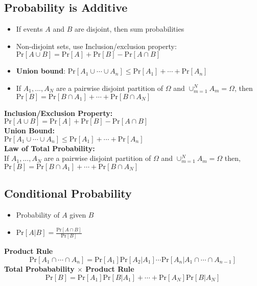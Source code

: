 \documentclass{article}\usepackage{amsmath,amssymb,amsthm,tikz,tkz-graph,color,chngpage,soul,hyperref,csquotes,graphicx,floatrow, listings}\newcommand*{\QEDB}{\hfill\ensuremath{\square}}\newtheorem*{prop}{Proposition}\renewcommand{\theenumi}{\alph{enumi}}\usepackage[shortlabels]{enumitem}\usepackage[nobreak=true]{mdframed}\usetikzlibrary{matrix,calc}\MakeOuterQuote{"}\usepackage[margin=0.75in]{geometry} \newtheorem{theorem}{Theorem}\newcommand{\Z}{\mathbb Z}\newcommand{\R}{\mathbb R}\newcommand{\Q}{\mathbb Q}\newcommand{\N}{\mathbb N}\newcommand{\x}[1]{\textrm{ #1 }}\newcommand{\pr}{\textrm{Pr}}
\begin{document}
\subsection*{Probability is Additive}
\begin{itemize}
    \item If events $A$ and $B$ are disjoint, then sum probabilities
    \item Non-disjoint sets, use Inclusion/exclusion property: $\pr[A\cup B] = \pr[A]+\pr[B]-\pr[A\cap B]$
    \item \textbf{Union bound}: $\pr[A_1\cup \cdots \cup A_n] \le \pr[A_1]+\cdots+\pr[A_n]$
    \item If $A_1,...,A_N$ are a pairwise disjoint partition of $\Omega$ and $\cup^{N}_{m=1}A_m=\Omega$, then $\pr[B]=\pr[B\cap A_1]+\cdots+\pr[B\cap A_N]$
\end{itemize}
\begin{mdframed}
\textbf{Inclusion/Exclusion Property:}\\
$\pr[A\cup B] = \pr[A]+\pr[B]-\pr[A\cap B]$\\
\textbf{Union Bound:}\\
$\pr[A_1\cup \cdots \cup A_n] \le \pr[A_1]+\cdots+\pr[A_n]$\\
\textbf{Law of Total Probability:}\\
If $A_1,...,A_N$ are a pairwise disjoint partition of $\Omega$ and $\cup^{N}_{m=1}A_m=\Omega$ then,\\
$\pr[B]=\pr[B\cap A_1]+\cdots+\pr[B\cap A_N]$
\end{mdframed}
\subsection*{Conditional Probability}
\begin{itemize}
    \item Probability of $A$ given $B$
    \item $\pr[A|B]=\frac{\pr[A\cap B]}{\pr[B]}$
\end{itemize}
\begin{mdframed}
\textbf{Product Rule}
\begin{equation}\pr[A_1\cap\cdots\cap A_n]=\pr[A_1]\pr[A_2|A_1]\cdots\pr[A_n|A_1\cap\cdots\cap A_{n-1}]\end{equation}
\textbf{Total Probabability $\times$ Product Rule}
\begin{equation}\pr[B]=\pr[A_1]\pr[B|A_1]+\cdots+\pr[A_N]\pr[B|A_N]\end{equation}
\end{mdframed}
\end{document}
